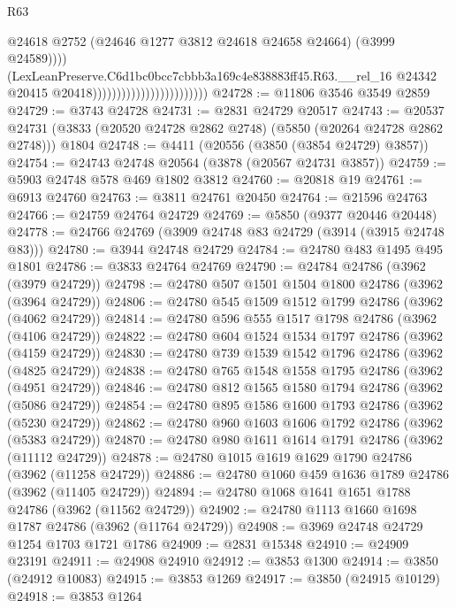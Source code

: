 \begin{lexlean}{R63}
\begin{coremodule}
                                                        @24618
                                                        @2752
                                                        (@24646 @1277 @3812 @24618 @24658 @24664)
                                                        (@3999 @24589))))
                                                  (LexLeanPreserve.C6d1bc0bcc7cbbb3a169c4e838883ff45.R63.__rel_16
                                                    @24342
                                                    @20415
                                                    @20418))))))))))))))))))))))))
@24728 := @11806 @3546 @3549 @2859
@24729 := @3743 @24728
@24731 := @2831 @24729 @20517
@24743 := @20537
    @24731
    (@3833 (@20520 @24728 @2862 @2748) (@5850 (@20264 @24728 @2862 @2748)))
    @1804
@24748 := @4411 (@20556 (@3850 (@3854 @24729) @3857))
@24754 := @24743 @24748 @20564 (@3878 (@20567 @24731 @3857))
@24759 := @5903 @24748 @578 @469 @1802 @3812
@24760 := @20818 @19
@24761 := @6913 @24760
@24763 := @3811 @24761 @20450
@24764 := @21596 @24763
@24766 := @24759 @24764 @24729
@24769 := @5850 (@9377 @20446 @20448)
@24778 := @24766 @24769 (@3909 @24748 @83 @24729 (@3914 (@3915 @24748 @83)))
@24780 := @3944 @24748 @24729
@24784 := @24780 @483 @1495 @495 @1801
@24786 := @3833 @24764 @24769
@24790 := @24784 @24786 (@3962 (@3979 @24729))
@24798 := @24780 @507 @1501 @1504 @1800 @24786 (@3962 (@3964 @24729))
@24806 := @24780 @545 @1509 @1512 @1799 @24786 (@3962 (@4062 @24729))
@24814 := @24780 @596 @555 @1517 @1798 @24786 (@3962 (@4106 @24729))
@24822 := @24780 @604 @1524 @1534 @1797 @24786 (@3962 (@4159 @24729))
@24830 := @24780 @739 @1539 @1542 @1796 @24786 (@3962 (@4825 @24729))
@24838 := @24780 @765 @1548 @1558 @1795 @24786 (@3962 (@4951 @24729))
@24846 := @24780 @812 @1565 @1580 @1794 @24786 (@3962 (@5086 @24729))
@24854 := @24780 @895 @1586 @1600 @1793 @24786 (@3962 (@5230 @24729))
@24862 := @24780 @960 @1603 @1606 @1792 @24786 (@3962 (@5383 @24729))
@24870 := @24780 @980 @1611 @1614 @1791 @24786 (@3962 (@11112 @24729))
@24878 := @24780 @1015 @1619 @1629 @1790 @24786 (@3962 (@11258 @24729))
@24886 := @24780 @1060 @459 @1636 @1789 @24786 (@3962 (@11405 @24729))
@24894 := @24780 @1068 @1641 @1651 @1788 @24786 (@3962 (@11562 @24729))
@24902 := @24780 @1113 @1660 @1698 @1787 @24786 (@3962 (@11764 @24729))
@24908 := @3969 @24748 @24729 @1254 @1703 @1721 @1786
@24909 := @2831 @15348
@24910 := @24909 @23191
@24911 := @24908 @24910
@24912 := @3853 @1300
@24914 := @3850 (@24912 @10083)
@24915 := @3853 @1269
@24917 := @3850 (@24915 @10129)
@24918 := @3853 @1264

\end{coremodule}
\end{lexlean}
